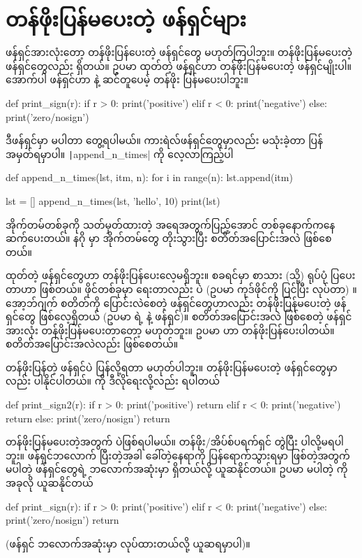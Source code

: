 \section{တန်ဖိုးပြန်မပေးတဲ့ ဖန်ရှင်များ}
ဖန်ရှင်အားလုံးတော့ တန်ဖိုးပြန်ပေးတဲ့ ဖန်ရှင်တွေ မဟုတ်ကြပါဘူး။ တန်ဖိုးပြန်မပေးတဲ့ ဖန်ရှင်တွေလည်း ရှိတယ်။ ဥပမာ  ထုတ်တဲ့   ဖန်ရှင်ဟာ တန်ဖိုးပြန်မပေးတဲ့ ဖန်ရှင်မျိုးပါ။ အောက်ပါ  ဖန်ရှင်ဟာ  နဲ့ ဆင်တူပေမဲ့ တန်ဖိုး  ပြန်မပေးပါဘူး။ 
%
\begin{py}
def print_sign(r):
    if r > 0:
        print('positive')
    elif r < 0:
        print('negative')
    else:
        print('zero/nosign')
\end{py}
%
ဒီဖန်ရှင်မှာ  မပါတာ တွေ့ရပါမယ်။ ကားရဲလ်ဖန်ရှင်တွေမှာလည်း  မသုံးခဲ့တာ ပြန်အမှတ်ရမှာပါ။ \texttt|append_n_times| ကို လေ့လာကြည့်ပါ
%
\begin{py}
def append_n_times(lst, itm, n):
    for i in range(n):
        lst.append(itm)

lst = []
append_n_times(lst, 'hello', 10)
print(lst)
\end{py}
%
အိုက်တမ်တစ်ခုကို သတ်မှတ်ထားတဲ့ အရေအတွက်ပြည့်အောင်  တစ်ခုနောက်ကနေ ဆက်ပေးတယ်။ နဂို  မှာ အိုက်တမ်တွေ တိုးသွားပြီး စတိတ်အပြောင်းအလဲ ဖြစ်စေတယ်။

 ထုတ်တဲ့ ဖန်ရှင်တွေဟာ တန်ဖိုးပြန်ပေးလေ့မရှိဘူး။ စခရင်မှာ စာသား (သို့) ရုပ်ပုံ ပြပေးတာဟာ  ဖြစ်တယ်။ ဖိုင်တစ်ခုမှာ ရေးတာလည်း  ပဲ (ဥပမာ  ကုဒ်ဖိုင်ကို ပြင်ပြီး  လုပ်တာ) ။ အော့ဘ်ဂျက် စတိတ်ကို ပြောင်းလဲစေတဲ့ ဖန်ရှင်တွေဟာလည်း တန်ဖိုးပြန်မပေးတဲ့ ဖန်ရှင်တွေ ဖြစ်လေ့ရှိတယ် (ဥပမာ  ရဲ့  နဲ့  ဖန်ရှင်)။ စတိတ်အပြောင်းအလဲ ဖြစ်စေတဲ့ ဖန်ရှင်အားလုံး တန်ဖိုးပြန်မပေးတာတော့ မဟုတ်ဘူး။ ဥပမာ  ဟာ တန်ဖိုးပြန်ပေးပါတယ်။ စတိတ်အပြောင်းအလဲလည်း ဖြစ်စေတယ်။

တန်ဖိုးပြန်တဲ့ ဖန်ရှင်ပဲ  ပြန်လို့ရတာ မဟုတ်ပါဘူး။ တန်ဖိုးပြန်မပေးတဲ့ ဖန်ရှင်တွေမှာလည်း  ပါနိုင်ပါတယ်။  ကို ဒီလိုရေးလို့လည်း ရပါတယ်
%
\begin{py}
def print_sign2(r):
    if r > 0:
        print('positive')
        return
    elif r < 0:
        print('negative')
        return
    else:
        print('zero/nosign')
        return
\end{py}
%
တန်ဖိုးပြန်မပေးတဲ့အတွက်  ပဲဖြစ်ရပါမယ်။ တန်ဖိုး/အိပ်စ်ပရက်ရှင် တွဲပြီး ပါလို့မရပါဘူး။ ဖန်ရှင်ဘလောက် ပြီးတဲ့အခါ ခေါ်တဲ့နေရာကို ပြန်ရောက်သွားရမှာ ဖြစ်တဲ့အတွက်  မပါတဲ့ ဖန်ရှင်တွေရဲ့ ဘလောက်အဆုံးမှာ  ရှိတယ်လို့ ယူဆနိုင်တယ်။ ဥပမာ  မပါတဲ့  ကို အခုလို ယူဆနိုင်တယ်
%
\begin{py}
def print_sign(r):
    if r > 0:
        print('positive')
    elif r < 0:
        print('negative')
    else:
        print('zero/nosign')
    return 
\end{py}
%
(ဖန်ရှင် ဘလောက်အဆုံးမှာ  လုပ်ထားတယ်လို့ ယူဆရမှာပါ)။

